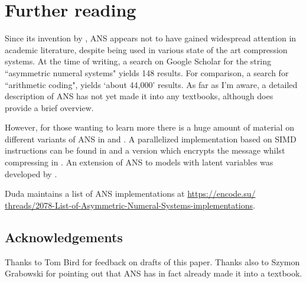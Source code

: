 \documentclass{article}
\theoremstyle{definition}
\begin{document}
\section{Further reading}
Since its invention by \citet{duda2009}, ANS appears not to have gained
widespread attention in academic literature, despite being used in various
state of the art compression systems. At the time of writing, a search on
Google Scholar for the string ``asymmetric numeral systems" yields 148 results.
For comparison, a search for ``arithmetic coding", yields `about 44,000'
results. As far as I'm aware, a detailed description of ANS has not yet made it
into any textbooks, although \citet{mcanlis2016} does provide a brief overview.

However, for those wanting to learn more there is a huge amount of material on
different variants of ANS in \citet{duda2009} and \citet{duda2015}. A
parallelized implementation based on SIMD instructions can be found in
\citet{giesen2014} and a version which encrypts the message whilst compressing
in \citet{duda2016}.  An extension of ANS to models with latent variables was
developed by \citet{townsend2019}.

Duda maintains a list of ANS implementations at
\url{
  https://encode.su/
  threads/2078-List-of-Asymmetric-Numeral-Systems-implementations}.

\subsection*{Acknowledgements}
  Thanks to Tom Bird for feedback on drafts of this paper. Thanks also to
  Szymon Grabowski for pointing out that ANS has in fact already made it into a
  textbook.

\printbibliography
\end{document}
